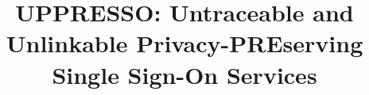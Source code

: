 \documentclass[letterpaper,twocolumn,10pt]{article}
\newcommand\usso{\textsf{UPPRESSO}}
\begin{document}
\date{}
\title{\Large \bf \usso: Untraceable and Unlinkable Privacy-PREserving\\Single Sign-On Services}



\end{document}
